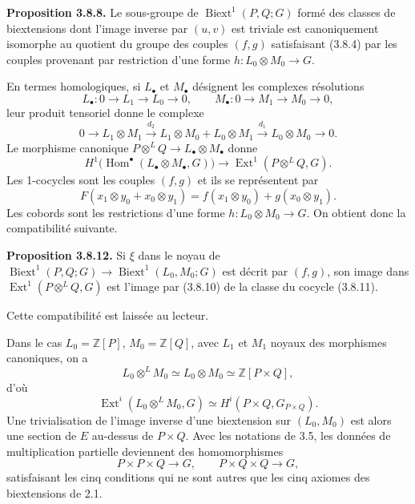 \documentclass[11pt]{article}
\providecommand{\Z}{\mathbb Z}
\providecommand{\Hom}{\operatorname{Hom}}
\providecommand{\Ext}{\operatorname{Ext}}
\providecommand{\Biext}{\operatorname{Biext}}
\providecommand{\Ext}{\operatorname{Ext}}
\begin{document}
\textbf{Proposition 3.8.8.}  Le sous-groupe de \(\Biext^1(P,Q;G)\) formé des classes de biextensions dont l'image inverse par \((u,v)\) est triviale est canoniquement isomorphe au quotient du groupe des couples \((f,g)\) satisfaisant (3.8.4) par les couples provenant par restriction d'une forme \(h:L_0\otimes M_0\to G\).

En termes homologiques, si \(L_\bullet\) et \(M_\bullet\) désignent les complexes résolutions
\begin{equation}\tag{3.8.9}
        L_\bullet:0\to L_1\to L_0\to0,
        \qquad
        M_\bullet:0\to M_1\to M_0\to0,
\end{equation}
leur produit tensoriel donne le complexe
\[
        0\to L_1\otimes M_1\xrightarrow{d_2}
        L_1\otimes M_0+L_0\otimes M_1\xrightarrow{d_1}
        L_0\otimes M_0\to0.
\]
Le morphisme canonique \(P\otimes^L Q\to L_\bullet\otimes M_\bullet\) donne
\begin{equation}\tag{3.8.10}
        H^1\bigl(\Hom^\bullet(L_\bullet\otimes M_\bullet,G)\bigr)\to \Ext^1(P\otimes^L Q,G).
\end{equation}
Les 1-cocycles sont les couples \((f,g)\) et ils se représentent par
\begin{equation}\tag{3.8.11}
        F(x_1\otimes y_0+x_0\otimes y_1)=f(x_1\otimes y_0)+g(x_0\otimes y_1).
\end{equation}
Les cobords sont les restrictions d'une forme \(h:L_0\otimes M_0\to G\).  On obtient donc la compatibilité suivante.

\textbf{Proposition 3.8.12.}  Si \(\xi\) dans le noyau de \(\Biext^1(P,Q;G)\to\Biext^1(L_0,M_0;G)\) est décrit par \((f,g)\), son image dans \(\Ext^1(P\otimes^L Q,G)\) est l'image par (3.8.10) de la classe du cocycle (3.8.11).

Cette compatibilité est laissée au lecteur.

Dans le cas \(L_0=\Z[P]\), \(M_0=\Z[Q]\), avec \(L_1\) et \(M_1\) noyaux des morphismes canoniques, on a
\[
        L_0\otimes^L M_0\simeq L_0\otimes M_0\simeq \Z[P\times Q],
\]
d'où
\[
        \Ext^i(L_0\otimes^L M_0,G)\simeq H^i(P\times Q,G_{P\times Q}).
\]
Une trivialisation de l'image inverse d'une biextension sur \((L_0,M_0)\) est alors une section de \(E\) au-dessus de \(P\times Q\).  Avec les notations de 3.5, les données de multiplication partielle deviennent des homomorphismes
\[
        P\times P\times Q\to G,
        \qquad P\times Q\times Q\to G,
\]
satisfaisant les cinq conditions qui ne sont autres que les cinq axiomes des biextensions de 2.1.
\end{document}
